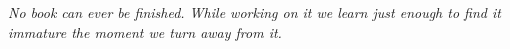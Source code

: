 \begin{totallyempty}

    \null\vfill

    \centering

      \raggedright{\Large\itshape%
      No book can ever be finished. 
      While working on it we learn just enough to find it immature the moment we turn away from it.
      }   
      \par%
    
    \vfill\vfill
\end{totallyempty}